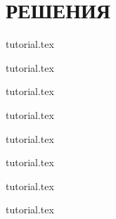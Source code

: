 \documentclass[a5paper, twoside, 11pt, openany]{book}
\begin{document}
\newpage
\section[Решения]{РЕШЕНИЯ}
\thispagestyle{plain}

\renewcommand{\importproblem}[1]{
\graphicspath{{problems/teachers/#1/statements/russian/}}
{tutorial.tex}	
}

\importproblem{pills}
\importproblem{naruto-jumping}
\importproblem{robot-gardener}
\importproblem{fishermen}
\importproblem{set}
\importproblem{interview-at-fun-club}
\importproblem{wolves}
\importproblem{straight-way}

\begin{landscape}
  
\end{landscape}
  

\pagestyle{empty}
\renewcommand{\contentsname}{Содержание}
\sloppy
\thispagestyle{empty}
\tableofcontents
\end{document}
